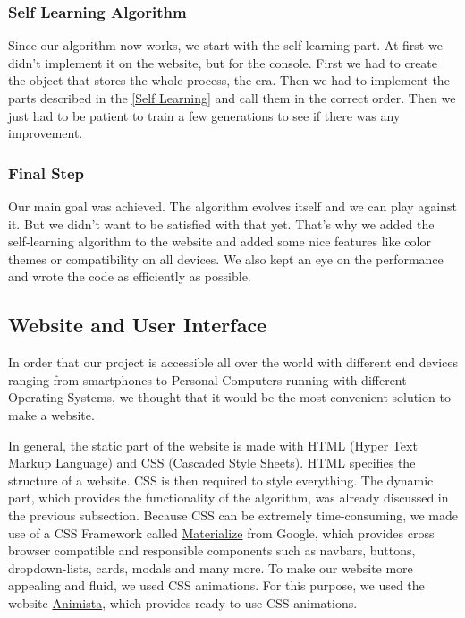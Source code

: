 \subsubsection{Self Learning Algorithm}
Since our algorithm now works, we start with the self learning part. At first we didn't implement it on the website, but for the console. First we had to create the object that stores the whole process, the era. Then we had to implement the parts described in the \autoref{Self Learning} and call them in the correct order. Then we just had to be patient to train a few generations to see if there was any improvement.

\subsubsection{Final Step}
Our main goal was achieved. The algorithm evolves itself and we can play against it. But we didn't want to be satisfied with that yet. That's why we added the self-learning algorithm to the website and added some nice features like color themes or compatibility on all devices. We also kept an eye on the performance and wrote the code as efficiently as possible.

\subsection{Website and User Interface} \label{websiteui}
In order that our project is accessible all over the world with different end devices ranging from smartphones to Personal Computers running with different Operating Systems, we thought that it would be the most convenient solution to make a website. 

In general, the static part of the website is made with HTML (Hyper Text Markup Language) and CSS (Cascaded Style Sheets). HTML specifies the structure of a website.  CSS is then required to style everything. The dynamic part, which provides the functionality of the algorithm, was already discussed in the previous subsection. 
Because CSS can be extremely time-consuming, we made use of a CSS Framework called \href{https://materializecss.com/}{Materialize} from Google, which provides cross browser compatible and responsible components such as navbars, buttons, dropdown-lists, cards, modals and many more. To make our website more appealing and fluid, we used CSS animations. For this purpose, we used the website \href{http://animista.net/}{Animista}, which provides ready-to-use CSS animations.

